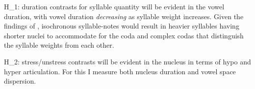 H_{1}: duration contrasts for syllable quantity will be evident in the vowel duration, with vowel duration {\it decreasing} as syllable weight increases. Given the findings of \citep{rossLehiste2001}, isochronous syllable-notes would result in heavier syllables having shorter nuclei to accommodate for the coda and complex codas that distinguish the syllable weights from each other. 

H_{2}: stress/unstress contrasts will be evident in the nucleus in terms of hypo and hyper articulation. For this I measure both nucleus duration and vowel space dispersion. 

